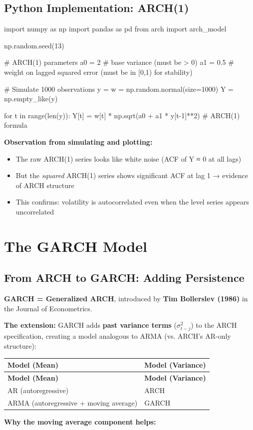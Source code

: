 \documentclass[12pt,openany]{book}
\theoremstyle{definition}
\theoremstyle{remark}
\begin{document}
\subsection{Python Implementation: ARCH(1)}
\begin{python}
import numpy as np
import pandas as pd
from arch import arch_model

np.random.seed(13)

# ARCH(1) parameters
a0 = 2    # base variance (must be > 0)
a1 = 0.5  # weight on lagged squared error (must be in [0,1) for stability)

# Simulate 1000 observations
y = w = np.random.normal(size=1000)
Y = np.empty_like(y)

for t in range(len(y)):
    Y[t] = w[t] * np.sqrt(a0 + a1 * y[t-1]**2)  # ARCH(1) formula
\end{python}
\textbf{Observation from simulating and plotting:}

\begin{itemize}
\item The raw ARCH(1) series looks like white noise (ACF of Y ≈ 0 at all lags)


\item But the \emph{squared} ARCH(1) series shows significant ACF at lag 1 → evidence of ARCH structure


\item This confirms: volatility is autocorrelated even when the level series appears uncorrelated


\end{itemize}
\medskip
\section{The GARCH Model}
\subsection{From ARCH to GARCH: Adding Persistence}
\textbf{GARCH = Generalized ARCH}, introduced by \textbf{Tim Bollerslev (1986)} in the Journal of Econometrics.

\textbf{The extension:} GARCH adds \textbf{past variance terms} ($\sigma^2_{t-j}$) to the ARCH specification, creating a model analogous to ARMA (vs. ARCH's AR-only structure):

\begingroup
\footnotesize
\begin{longtable}{@{}L{0.27\textwidth}L{0.66\textwidth}@{}}
\toprule
\textbf{Model (Mean)} & \textbf{Model (Variance)} \\
\midrule
\endfirsthead
\toprule
\textbf{Model (Mean)} & \textbf{Model (Variance)} \\
\midrule
\endhead
AR (autoregressive) & ARCH \\
ARMA (autoregressive + moving average) & GARCH \\
\bottomrule
\end{longtable}
\endgroup
\textbf{Why the moving average component helps:}
\end{document}
